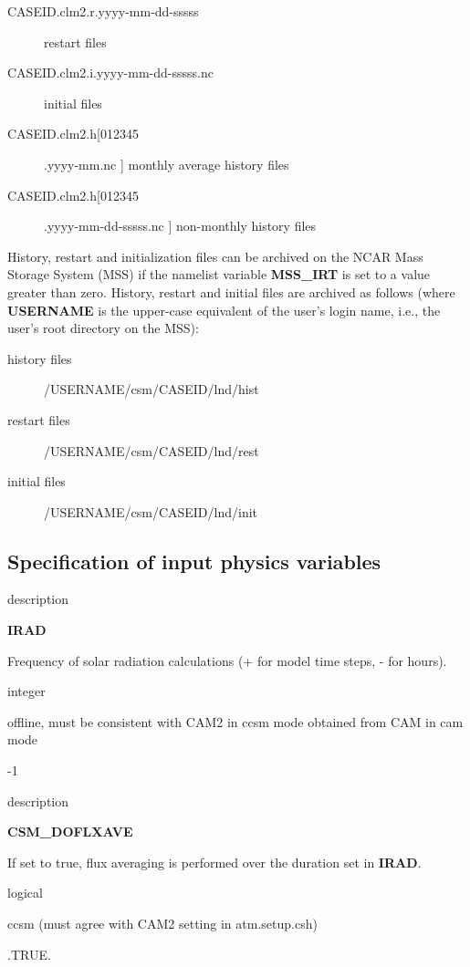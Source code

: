 \begin{center}
\begin{description}
\item [CASEID.clm2.r.yyyy-mm-dd-sssss ] restart files
\item [CASEID.clm2.i.yyyy-mm-dd-sssss.nc ] initial files
\item [CASEID.clm2.h[012345].yyyy-mm.nc ] monthly average history files
\item [CASEID.clm2.h[012345].yyyy-mm-dd-sssss.nc ] non-monthly history files 
\end{description}
\end{center}

\noindent History, restart and initialization files can be archived on the NCAR
Mass Storage System (MSS) if the namelist variable {\bf MSS\_IRT} is
set to a value greater than zero.  History, restart and initial files are
archived as follows (where {\bf USERNAME} is the upper-case equivalent
of the user's login name, i.e., the user's root directory on the MSS):

\begin{description} 
 \item [history files] /USERNAME/csm/CASEID/lnd/hist
 \item [restart files] /USERNAME/csm/CASEID/lnd/rest
 \item [initial files] /USERNAME/csm/CASEID/lnd/init
\end{description}
 
\subsection {Specification of input physics variables}
\label{subsec_physics}

\begin{Ventry}{description}
 \item[{\bf name}] {\bf IRAD} 
 \item[description] 
	Frequency of solar radiation calculations 
	(+ for model time steps, - for hours). 
 \item[type] integer   
 \item[mode] offline, must be consistent with 
	CAM2 in ccsm mode obtained from CAM in cam mode   
 \item[default] -1   
\end{Ventry}
\medskip

\begin{Ventry}{description}
 \item[{\bf name}] {\bf CSM\_DOFLXAVE}  
 \item[description] 
	If set to true, flux averaging is performed over 
	the duration set in {\bf IRAD}.   
 \item[type] logical    
 \item[mode] ccsm (must agree with CAM2 setting in atm.setup.csh)  
 \item[default] .TRUE.   
\end{Ventry}
\medskip

